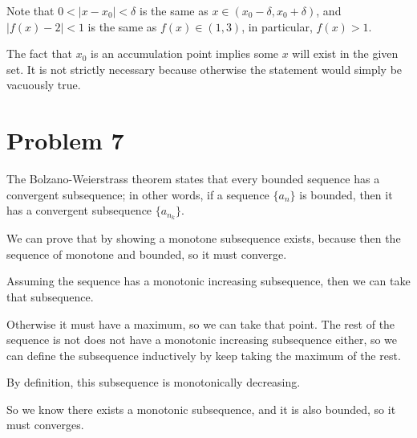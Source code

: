 \documentclass{article}
\begin{document}
Note that $ 0 < | x - x_0| < \delta $ is the same as $ x \in (x_0 - \delta, x_0 + \delta) $, and $ |f(x) - 2| < 1 $ is the same as $ f(x) \in (1, 3) $, in particular, $ f(x) > 1 $.

The fact that $ x_0 $ is an accumulation point implies some $ x $ will exist in the given set. It is not strictly necessary because otherwise the statement would simply be vacuously true.

\section*{Problem 7}
The Bolzano-Weierstrass theorem states that every bounded sequence has a convergent subsequence; in other words, if a sequence $ \{ a_n \} $ is bounded, then it has a convergent subsequence $ \{ a_{n_k} \} $.

We can prove that by showing a monotone subsequence exists, because then the sequence of monotone and bounded, so it must converge.

Assuming the sequence has a monotonic increasing subsequence, then we can take that subsequence.

Otherwise it must have a maximum, so we can take that point. The rest of the sequence is not does not have a monotonic increasing subsequence either, so we can define the subsequence inductively by keep taking the maximum of the rest.

By definition, this subsequence is monotonically decreasing. 

So we know there exists a monotonic subsequence, and it is also bounded, so it must converges.
\end{document}
